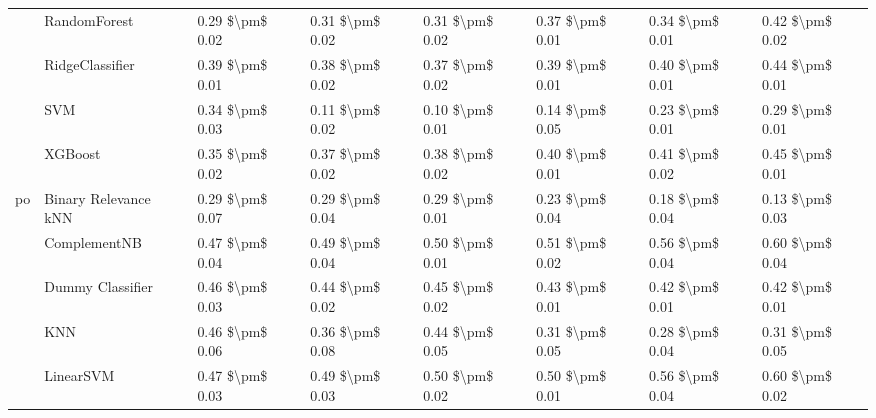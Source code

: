 \begin{tabular}{llllllll}
   & RandomForest &  0.29 \$\textbackslash pm\$ 0.02 &           0.31 \$\textbackslash pm\$ 0.02 &       0.31 \$\textbackslash pm\$ 0.02 &        0.37 \$\textbackslash pm\$ 0.01 &                         0.34 \$\textbackslash pm\$ 0.01 &      0.42 \$\textbackslash pm\$ 0.02 \\
   & RidgeClassifier &  0.39 \$\textbackslash pm\$ 0.01 &           0.38 \$\textbackslash pm\$ 0.02 &       0.37 \$\textbackslash pm\$ 0.02 &        0.39 \$\textbackslash pm\$ 0.01 &                         0.40 \$\textbackslash pm\$ 0.01 &      0.44 \$\textbackslash pm\$ 0.01 \\
   & SVM &  0.34 \$\textbackslash pm\$ 0.03 &           0.11 \$\textbackslash pm\$ 0.02 &       0.10 \$\textbackslash pm\$ 0.01 &        0.14 \$\textbackslash pm\$ 0.05 &                         0.23 \$\textbackslash pm\$ 0.01 &      0.29 \$\textbackslash pm\$ 0.01 \\
   & XGBoost &  0.35 \$\textbackslash pm\$ 0.02 &           0.37 \$\textbackslash pm\$ 0.02 &       0.38 \$\textbackslash pm\$ 0.02 &        0.40 \$\textbackslash pm\$ 0.01 &                         0.41 \$\textbackslash pm\$ 0.02 &      0.45 \$\textbackslash pm\$ 0.01 \\
po & Binary Relevance kNN &  0.29 \$\textbackslash pm\$ 0.07 &           0.29 \$\textbackslash pm\$ 0.04 &       0.29 \$\textbackslash pm\$ 0.01 &        0.23 \$\textbackslash pm\$ 0.04 &                         0.18 \$\textbackslash pm\$ 0.04 &      0.13 \$\textbackslash pm\$ 0.03 \\
   & ComplementNB &  0.47 \$\textbackslash pm\$ 0.04 &           0.49 \$\textbackslash pm\$ 0.04 &       0.50 \$\textbackslash pm\$ 0.01 &        0.51 \$\textbackslash pm\$ 0.02 &                         0.56 \$\textbackslash pm\$ 0.04 &      0.60 \$\textbackslash pm\$ 0.04 \\
   & Dummy Classifier &  0.46 \$\textbackslash pm\$ 0.03 &           0.44 \$\textbackslash pm\$ 0.02 &       0.45 \$\textbackslash pm\$ 0.02 &        0.43 \$\textbackslash pm\$ 0.01 &                         0.42 \$\textbackslash pm\$ 0.01 &      0.42 \$\textbackslash pm\$ 0.01 \\
   & KNN &  0.46 \$\textbackslash pm\$ 0.06 &           0.36 \$\textbackslash pm\$ 0.08 &       0.44 \$\textbackslash pm\$ 0.05 &        0.31 \$\textbackslash pm\$ 0.05 &                         0.28 \$\textbackslash pm\$ 0.04 &      0.31 \$\textbackslash pm\$ 0.05 \\
   & LinearSVM &  0.47 \$\textbackslash pm\$ 0.03 &           0.49 \$\textbackslash pm\$ 0.03 &       0.50 \$\textbackslash pm\$ 0.02 &        0.50 \$\textbackslash pm\$ 0.01 &                         0.56 \$\textbackslash pm\$ 0.04 &      0.60 \$\textbackslash pm\$ 0.02 \\

\end{tabular}
